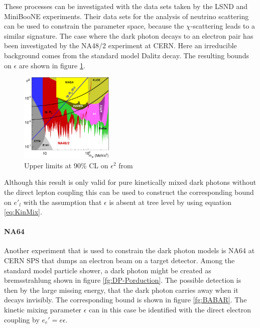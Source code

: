 These processes can be investigated with the data sets taken by the LSND and MiniBooNE experiments. Their data sets for the analysis of neutrino scattering can be used to constrain the parameter space, because the $\chi$-scattering leads to a similar signature. 
The case where the dark photon decays to an electron pair has been investigated by the NA48/2 experiment at CERN. Here an irreducible background comes from the standard model Dalitz decay. The resulting bounds on $\epsilon$ are shown in figure \ref{fg:NA48Bounds}.
\begin{figure}[H]
  \centering
    \includegraphics[width=0.4\textwidth]{imgs/dp_exclusion}
    \caption{Upper limits at 90\% CL on $\epsilon^2$ from \cite{Lurkin:2017aqo}}
    \label{fg:NA48Bounds}
\end{figure}
Although this result is only valid for pure kinetically mixed dark photons without the direct lepton coupling this can be used to construct the corresponding bound on $e'_l$ with the assumption that $\epsilon$ is absent at tree level by using equation \ref{eq:KinMix}.

\paragraph{NA64}
Another experiment that is used to constrain the dark photon models is NA64 at CERN SPS that dumps an electron beam on a target detector. Among the standard model particle shower, a dark photon might be created as bremsstrahlung shown in figure \ref{fg:DP-Porduction}. The possible detection is then by the large missing energy, that the dark photon carries away when it decays invisibly. The corresponding bound is shown in figure \ref{fg:BABAR}. The kinetic mixing parameter $\epsilon$ can in this case be identified with the direct electron coupling by $e_e'=e\epsilon$.

